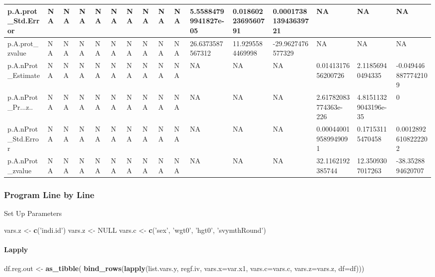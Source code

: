 \documentclass[
]{book}
\newenvironment{Shaded}{\begin{snugshade}}{\end{snugshade}}
\newcommand{\DataTypeTok}[1]{\textcolor[rgb]{0.13,0.29,0.53}{#1}}
\newcommand{\KeywordTok}[1]{\textcolor[rgb]{0.13,0.29,0.53}{\textbf{#1}}}
\newcommand{\NormalTok}[1]{#1}
\newcommand{\OtherTok}[1]{\textcolor[rgb]{0.56,0.35,0.01}{#1}}
\newcommand{\StringTok}[1]{\textcolor[rgb]{0.31,0.60,0.02}{#1}}
\begin{document}
\begin{table}[!h]
{\begin{tabular}{l|l|l|l|l|l|l|l|l|l|l|l|l|l|l|l}
\hline
\rowcolor{gray!6}  p.A.prot\_Std.Error & NA & NA & NA & NA & NA & NA & NA & NA & NA & 5.55884799941827e-05 & 0.0186022369560791 & 0.000173813943639721 & NA & NA & NA\\
\hline
p.A.prot\_zvalue & NA & NA & NA & NA & NA & NA & NA & NA & NA & 26.6373587567312 & 11.9295584469998 & -29.9627476577329 & NA & NA & NA\\
\hline
\rowcolor{gray!6}  p.A.nProt\_Estimate & NA & NA & NA & NA & NA & NA & NA & NA & NA & NA & NA & NA & 0.0141317656200726 & 2.11856940494335 & -0.0494468877742109\\
\hline
p.A.nProt\_Pr...z.. & NA & NA & NA & NA & NA & NA & NA & NA & NA & NA & NA & NA & 2.61782083774363e-226 & 4.81511329043196e-35 & 0\\
\hline
\rowcolor{gray!6}  p.A.nProt\_Std.Error & NA & NA & NA & NA & NA & NA & NA & NA & NA & NA & NA & NA & 0.000440019589949091 & 0.17153115470458 & 0.00128926108222202\\
\hline
p.A.nProt\_zvalue & NA & NA & NA & NA & NA & NA & NA & NA & NA & NA & NA & NA & 32.1162192385744 & 12.3509307017263 & -38.3528894620707\\
\hline
\end{tabular}}
\end{table}

\hypertarget{program-line-by-line}{%
\subsubsection{Program Line by Line}\label{program-line-by-line}}

Set Up Parameters

\begin{Shaded}
\begin{Highlighting}[]
\NormalTok{vars.z <-}\StringTok{ }\KeywordTok{c}\NormalTok{(}\StringTok{'indi.id'}\NormalTok{)}
\NormalTok{vars.z <-}\StringTok{ }\OtherTok{NULL}
\NormalTok{vars.c <-}\StringTok{ }\KeywordTok{c}\NormalTok{(}\StringTok{'sex'}\NormalTok{, }\StringTok{'wgt0'}\NormalTok{, }\StringTok{'hgt0'}\NormalTok{, }\StringTok{'svymthRound'}\NormalTok{)}
\end{Highlighting}
\end{Shaded}

\hypertarget{lapply}{%
\paragraph{Lapply}\label{lapply}}

\begin{Shaded}
\begin{Highlighting}[]
\NormalTok{df.reg.out <-}\StringTok{ }\KeywordTok{as_tibble}\NormalTok{(}
  \KeywordTok{bind_rows}\NormalTok{(}\KeywordTok{lapply}\NormalTok{(list.vars.y, regf.iv,}
                   \DataTypeTok{vars.x=}\NormalTok{var.x1, }\DataTypeTok{vars.c=}\NormalTok{vars.c, }\DataTypeTok{vars.z=}\NormalTok{vars.z, }\DataTypeTok{df=}\NormalTok{df)))}
\end{Highlighting}
\end{Shaded}
\end{document}
